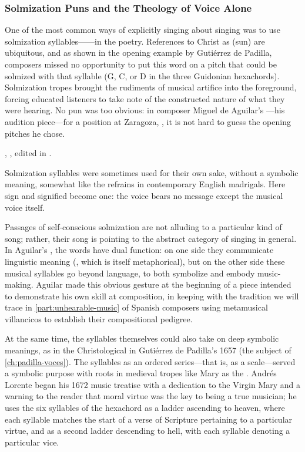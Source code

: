 \subsubsection{Solmization Puns and the Theology of Voice Alone}

One of the most common ways of explicitly singing about singing was to use
solmization syllables------in the poetry.
References to Christ as  (sun) are ubiquitous, and as shown in the
opening example by Gutiérrez de Padilla, composers missed no opportunity to put
this word on a pitch that could be solmized with that syllable (G, C, or D in
the three Guidonian hexachords).
Solmization tropes brought the rudiments of musical artifice into the
foreground, forcing educated listeners to take note of the constructed nature
of what they were hearing.
No pun was too obvious: in composer Miguel de Aguilar's ---his
audition piece---for a position at Zaragoza, , it
is not hard to guess the opening pitches he chose.%
\begin{Footnote}
    , , edited
    in \autocite[34--64]{Ezquerro:MME55}.
\end{Footnote}
Solmization syllables were sometimes used for their own sake, without a
symbolic meaning, somewhat like the  refrains in contemporary
English madrigals.
Here sign and signified become one: the voice bears no message except the
musical voice itself.

Passages of self-conscious solmization are not alluding to a particular kind of
song; rather, their song is pointing to the abstract category of
singing in general.
In Aguilar's , the words have dual function: on one side
they communicate linguistic meaning (, which is itself
metaphorical), but on the other side these musical syllables go beyond
language, to both symbolize and embody music-making. 
Aguilar made this obvious gesture at the beginning of a piece intended to
demonstrate his own skill at composition, in keeping with the tradition we will
trace in \cref{part:unhearable-music} of Spanish composers using metamusical
villancicos to establish their compositional pedigree.

At the same time, the syllables themselves could also take on deep symbolic
meanings, as in the Christological  in
Gutiérrez de Padilla's 1657  (the subject of
\cref{ch:padilla-voces}).
The syllables as an ordered series---that is, as a scale---served a symbolic
purpose with roots in medieval tropes like Mary as the .%
    \citXXX[Gilbert?]
Andrés Lorente began his 1672 music treatise with a dedication to the Virgin
Mary and a warning to the reader that moral virtue was the key to being a true
musician; he uses the six syllables of the hexachord as a ladder ascending to
heaven, where each syllable matches the start of a verse of Scripture
pertaining to a particular virtue, and as a second ladder descending to
hell\XXX[check], with each syllable denoting a particular vice.

